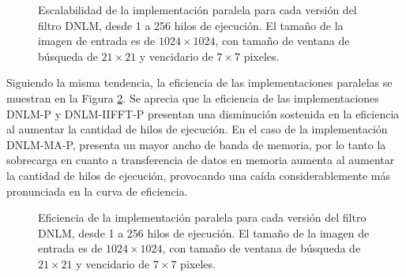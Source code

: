 \begin{figure}
\centering
  \caption[Escalabilidad de las implementaciones paralelas del filtro DNLM]{Escalabilidad de la implementación paralela para cada versión del filtro DNLM, desde 1 a 256 hilos de ejecución. El tama\~no de la imagen de entrada es de $1024\times1024$, con tama\~no de ventana de búsqueda de $21 \times 21$ y vencidario de $7 \times 7$ pixeles.\label{fig:scalability}}
  \end{figure}
  
  Siguiendo la misma tendencia, la eficiencia de las implementaciones paralelas se muestran en la Figura \ref{fig:efficiency}. Se aprecia que la eficiencia de las implementaciones DNLM-P y DNLM-IIFFT-P presentan una disminución sostenida en la eficiencia al aumentar la cantidad de hilos de ejecución. En el caso de la implementación DNLM-MA-P, presenta un mayor ancho de banda de memoria, por lo tanto la sobrecarga en cuanto a transferencia de datos en memoria aumenta al aumentar la cantidad de hilos de ejecución, provocando una caída considerablemente más pronunciada en la curva de eficiencia.
  
  \begin{figure}
  \centering
  \caption[Eficiencia de las implementaciones paralelas del filtro DNLM.]{Eficiencia de la implementación paralela para cada versión del filtro DNLM, desde 1 a 256 hilos de ejecución. El tama\~no de la imagen de entrada es de $1024\times1024$, con tama\~no de ventana de búsqueda de $21 \times 21$ y vencidario de $7 \times 7$ pixeles. \label{fig:efficiency}}
  \end{figure}
  
